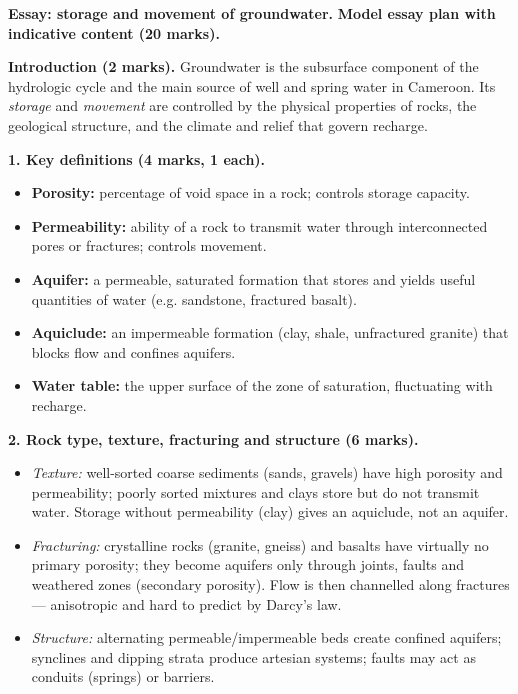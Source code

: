 \documentclass[11pt]{article}
\begin{document}
\begin{corrige}[Exercise 11]
\textbf{Essay: storage and movement of groundwater.}
\textbf{Model essay plan with indicative content (20 marks).}

\textbf{Introduction (2 marks).} Groundwater is the subsurface component of the hydrologic cycle and the main source of well and spring water in Cameroon. Its \emph{storage} and \emph{movement} are controlled by the physical properties of rocks, the geological structure, and the climate and relief that govern recharge.

\textbf{1. Key definitions (4 marks, 1 each).}
\begin{itemize}
\item \textbf{Porosity:} percentage of void space in a rock; controls storage capacity.
\item \textbf{Permeability:} ability of a rock to transmit water through interconnected pores or fractures; controls movement.
\item \textbf{Aquifer:} a permeable, saturated formation that stores and yields useful quantities of water (e.g. sandstone, fractured basalt).
\item \textbf{Aquiclude:} an impermeable formation (clay, shale, unfractured granite) that blocks flow and confines aquifers.
\item \textbf{Water table:} the upper surface of the zone of saturation, fluctuating with recharge.
\end{itemize}

\textbf{2. Rock type, texture, fracturing and structure (6 marks).}
\begin{itemize}
\item \emph{Texture:} well-sorted coarse sediments (sands, gravels) have high porosity and permeability; poorly sorted mixtures and clays store but do not transmit water. Storage without permeability (clay) gives an aquiclude, not an aquifer.
\item \emph{Fracturing:} crystalline rocks (granite, gneiss) and basalts have virtually no primary porosity; they become aquifers only through joints, faults and weathered zones (secondary porosity). Flow is then channelled along fractures — anisotropic and hard to predict by Darcy's law.
\item \emph{Structure:} alternating permeable/impermeable beds create confined aquifers; synclines and dipping strata produce artesian systems; faults may act as conduits (springs) or barriers.
\end{itemize}


\end{corrige}
\end{document}
